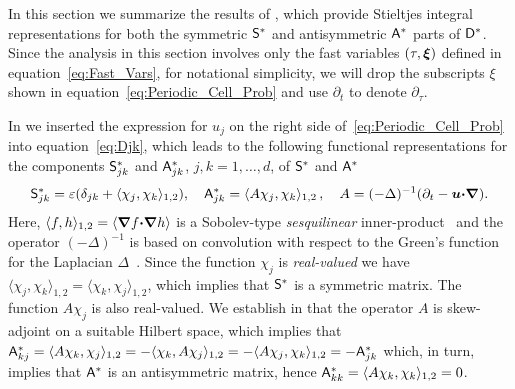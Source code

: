 \documentclass[amsa]{ipart}
\begin{document}
In this section we summarize the results of
, which provide 
Stieltjes integral representations for both the symmetric $\mathsf{S}^*$ and
antisymmetric $\mathsf{A}^*$ parts of $\mathsf{D}^*$. Since the analysis in this 
section involves only the fast variables $(\tau,\boldsymbol{\xi})$ defined
in equation~\eqref{eq:Fast_Vars}, for notational simplicity,
we will drop the subscripts $\xi$ shown in
equation~\eqref{eq:Periodic_Cell_Prob} and use $\partial_t$ to denote $\partial_\tau$.




In  we inserted the expression for $u_j$ on
the right side of~\eqref{eq:Periodic_Cell_Prob}
into equation~\eqref{eq:Djk}, which leads to the following functional
representations for the components $\mathsf{S}^*_{jk}$ and $\mathsf{A}^*_{jk}$,
$j,k=1,\ldots,d$, of $\mathsf{S}^*$ and $\mathsf{A}^*$~\cite{Pavliotis:PHD_Thesis}      
%
\begin{align}\label{eq:Eff_Diffusivity_Sobolev}
  \Sm^*_{jk}=\varepsilon(\delta_{jk}+\langle\chi_j,\chi_k\rangle_{1,2}),
  \quad
  \Am^*_{jk}=\langle A\chi_j,\chi_k\rangle_{1,2}\,,
  \quad
  A=(-\Delta)^{-1}(\partial_t-\vecu \bcdot\bnabla).
\end{align}
%
Here, $\langle f,h\rangle_{1,2}=\langle\mbox{\boldmath${\nabla}$} f\mbox{\boldmath${\cdot}$}\mbox{\boldmath${\nabla}$} h\rangle$ is a Sobolev-type
\emph{sesquilinear} inner-product~\cite{McOwen:2003:PDE} and the
operator $(-\Delta)^{-1}$ is based on convolution with respect to the
Green's function for the Laplacian $\Delta$~\cite{Stakgold:BVP:2000}. 
Since the function $\chi_j$ is
\emph{real-valued} we have $\langle\chi_j,\chi_k\rangle_{1,2}=\langle\chi_k,\chi_j\rangle_{1,2}$, which implies that
$\mathsf{S}^*$ is a symmetric matrix. The function $A\chi_j$ is also
real-valued. We establish in  that the
operator $A$ is skew-adjoint on a suitable Hilbert space, which
implies that
$\mathsf{A}^*_{kj}=\langle A\chi_k,\chi_j\rangle_{1,2}=-\langle\chi_k,A\chi_j\rangle_{1,2}=-\langle A\chi_j,\chi_k\rangle_{1,2}=-\mathsf{A}^*_{jk}$
which, in turn, implies that $\mathsf{A}^*$ is an antisymmetric matrix, hence
$\mathsf{A}^*_{kk}=\langle A\chi_k,\chi_k\rangle_{1,2}=0$.  
\end{document}
